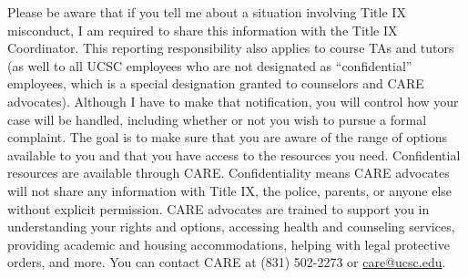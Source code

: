 \documentclass{article}
\begin{document}
Please be aware that if you tell me about a situation involving Title IX
misconduct, I am required to share this information with the Title IX
Coordinator. This reporting responsibility also applies to course TAs and tutors
(as well to all UCSC employees who are not designated as ``confidential''
employees, which is a special designation granted to counselors and CARE
advocates). Although I have to make that notification, you will control how your
case will be handled, including whether or not you wish to pursue a formal
complaint. The goal is to make sure that you are aware of the range of options
available to you and that you have access to the resources you need.
Confidential resources are available through CARE. Confidentiality means CARE
advocates will not share any information with Title IX, the police, parents, or
anyone else without explicit permission.  CARE advocates are trained to support
you in understanding your rights and options, accessing health and counseling
services, providing academic and housing accommodations, helping with legal
protective orders, and more. You can contact CARE at (831) 502-2273 or
\url{care@ucsc.edu}.
\end{document}
